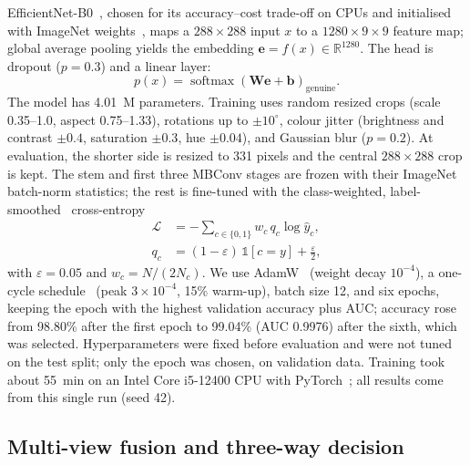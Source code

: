 \documentclass[pdflatex,iicol,sn-mathphys-num]{sn-jnl}
\begin{document}
EfficientNet-B0~\cite{tan2019efficientnet}, chosen for its accuracy--cost trade-off on
CPUs and initialised with ImageNet weights~\cite{deng2009imagenet}, maps a
$288\times288$ input $x$ to a $1280\times9\times9$ feature map; global average pooling
yields the embedding $\mathbf{e}=f(x)\in\mathbb{R}^{1280}$. The head is dropout
($p=0.3$) and a linear layer:
\begin{equation}
p(x) = \operatorname{softmax}\!\left(\mathbf{W}\mathbf{e}+\mathbf{b}\right)_{\text{genuine}} .
\label{eq:prob}
\end{equation}
The model has 4.01~M parameters. Training uses random resized crops (scale 0.35--1.0,
aspect 0.75--1.33), rotations up to $\pm10^\circ$, colour jitter (brightness and contrast
$\pm0.4$, saturation $\pm0.3$, hue $\pm0.04$), and Gaussian blur ($p=0.2$). At
evaluation, the shorter side is resized to 331 pixels and the central $288\times288$
crop is kept. The stem and first three MBConv stages are frozen with their ImageNet
batch-norm statistics; the rest is fine-tuned with the class-weighted,
label-smoothed~\cite{szegedy2016inception} cross-entropy
\begin{align}
\mathcal{L} &= -\sum_{c\in\{0,1\}} w_c\, q_c \log \hat{y}_c, \nonumber\\
q_c &= (1-\varepsilon)\,\mathbb{1}[c=y] + \tfrac{\varepsilon}{2},
\label{eq:loss}
\end{align}
with $\varepsilon=0.05$ and $w_c=N/(2N_c)$. We use AdamW~\cite{loshchilov2019adamw}
(weight decay $10^{-4}$), a one-cycle schedule~\cite{smith2019superconvergence} (peak
$3\times10^{-4}$, 15\% warm-up), batch size 12, and six epochs, keeping the epoch with
the highest validation accuracy plus AUC; accuracy rose from 98.80\% after the first
epoch to 99.04\% (AUC 0.9976) after the sixth, which was selected. Hyperparameters were
fixed before evaluation and were not tuned on the test split; only the epoch was chosen,
on validation data. Training took about 55~min on an Intel Core i5-12400 CPU with
PyTorch~\cite{paszke2019pytorch}; all results come from this single run (seed 42).

\subsection{Multi-view fusion and three-way decision}\label{sec:decision}
\end{document}
